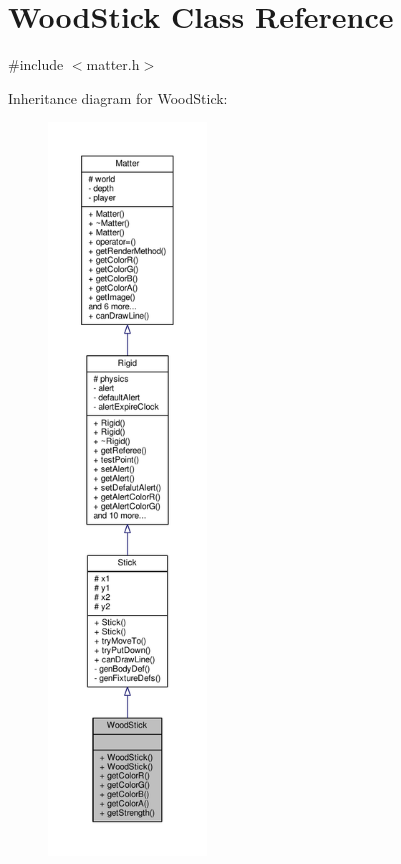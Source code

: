 \hypertarget{classWoodStick}{}\section{Wood\+Stick Class Reference}
\label{classWoodStick}


{\ttfamily \#include $<$matter.\+h$>$}



Inheritance diagram for Wood\+Stick\+:
\nopagebreak
\begin{figure}[H]
\begin{center}
\leavevmode
\includegraphics[height=550pt]{classWoodStick__inherit__graph}
\end{center}
\end{figure}


